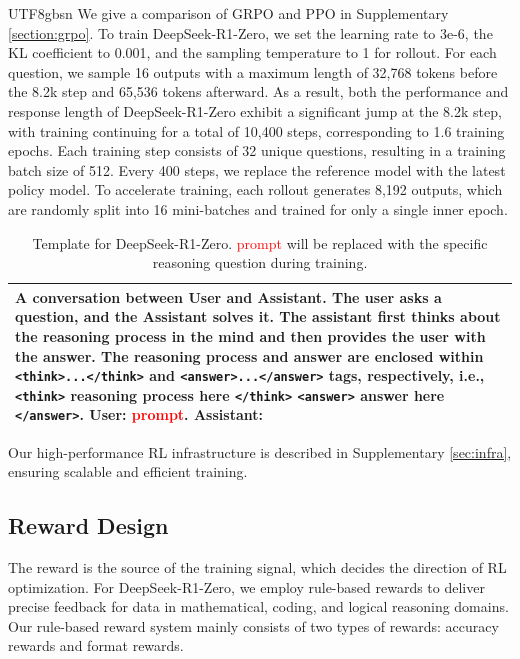 \documentclass[11pt, a4paper, logo, copyright, nonumbering]{deepseek}
\begin{document}
\begin{CJK*}{UTF8}{gbsn}
We give a comparison of GRPO and PPO in Supplementary \ref{section:grpo}.
To train DeepSeek-R1-Zero, we set the learning rate to 3e-6, the KL coefficient to 0.001, and the sampling temperature to 1 for rollout. For each question, we sample 16 outputs with a maximum length of 32,768 tokens before the 8.2k step and 65,536 tokens afterward. As a result, both the performance and response length of DeepSeek-R1-Zero exhibit a significant jump at the 8.2k step, with training continuing for a total of 10,400 steps, corresponding to 1.6 training epochs. Each training step consists of 32 unique questions, resulting in a training batch size of 512. Every 400 steps, we replace the reference model with the latest policy model. To accelerate training, each rollout generates 8,192 outputs, which are randomly split into 16 mini-batches and trained for only a single inner epoch.
\begin{table}[h]
    \centering
    \small
    \caption{Template for DeepSeek-R1-Zero. \textcolor{red}{prompt} will be replaced with the specific reasoning question during training.}
    \begin{tabularx}{\textwidth}{X}
    \toprule
    A conversation between User and Assistant. The user asks a question, and the Assistant solves it. 
    The assistant first thinks about the reasoning process in the mind and then provides the user with the answer.
    The reasoning process and answer are enclosed within \texttt{<think>...</think>} and \texttt{<answer>...</answer>} tags, respectively, i.e., \texttt{<think>} reasoning process here \texttt{</think>} \texttt{<answer>} answer here \texttt{</answer>}. 
    User: \textcolor{red}{prompt}. Assistant: \\
    \bottomrule
    \end{tabularx}
    \label{tab:r0_template}
\end{table}

Our high-performance RL infrastructure is described in Supplementary \ref{sec:infra}, ensuring scalable and efficient training.
\subsection{Reward Design} 
\label{section:reward}
The reward is the source of the training signal, which decides the direction of RL optimization.
For DeepSeek-R1-Zero,  we employ rule-based rewards to 
deliver precise feedback for data in mathematical, coding, and logical reasoning domains. Our rule-based reward system mainly consists of two types of rewards: accuracy rewards and format rewards.


\end{CJK*}
\end{document}
